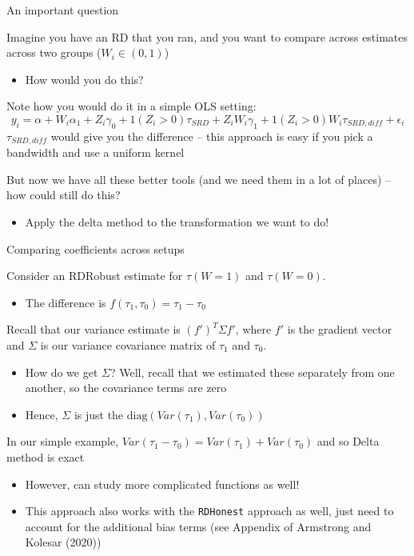 \documentclass[notes,11pt, aspectratio=169]{beamer}
\newenvironment{wideitemize}{\itemize\addtolength{\itemsep}{10pt}}{\enditemize}
\begin{document}
\begin{frame}{An important question}
  \begin{wideitemize}
  \item Imagine you have an RD that you ran, and you want to compare
    across estimates across two groups ($W_{i} \in (0,1)$)
    \begin{itemize}
    \item How would you do this?
    \end{itemize}
  \item Note how you would do it in a simple OLS setting:
    $$y_{i} = \alpha + W_{i}\alpha_{1} + Z_{i}\gamma_{0} + 1(Z_{i} > 0)\tau_{SRD} + Z_{i}W_{i}\gamma_{1} + 1(Z_{i} > 0)W_{i}\tau_{SRD,diff} + \epsilon_{i} $$
    $\tau_{SRD,diff}$ would give you the difference -- this approach
    is easy if you pick a bandwidth and use a uniform kernel
  \item But now we have all these better tools (and we need them in a
    lot of places) -- how could still do this?
    \begin{itemize}
    \item  Apply the delta method to the transformation we want to do!
    \end{itemize}
    
  \end{wideitemize}
\end{frame}

\begin{frame}{Comparing coefficients across setups}
  \begin{wideitemize}
  \item Consider an RDRobust estimate for $\tau(W=1)$ and $\tau(W=0)$. 
    \begin{itemize}
    \item The difference is $f(\tau_{1}, \tau_{0}) = \tau_{1} - \tau_{0}$
    \end{itemize}
  \item Recall that our variance estimate is $(f')^{T}\Sigma f'$,
    where $f'$ is the gradient vector and $\Sigma$ is our variance
    covariance matrix of $\tau_{1}$ and $\tau_{0}$.
    \begin{itemize}
    \item How do we get $\Sigma$? Well, recall that we estimated these
      separately from one another, so the covariance terms are zero
    \item Hence, $\Sigma$ is just the
      $\text{diag}(Var(\tau_{1}), Var(\tau_{0}))$
    \end{itemize}
  \item In our simple example, $Var(\tau_{1} - \tau_{0}) = Var(\tau_{1}) + Var(\tau_{0})$ and so Delta method is exact
    \begin{itemize}
    \item However, can study more complicated functions as well!
    \item This approach also works with the \texttt{RDHonest} approach
      as well, just need to account for the additional bias terms (see
      Appendix of Armstrong and Kolesar (2020))
    \end{itemize}
  \end{wideitemize}
\end{frame}
\end{document}
